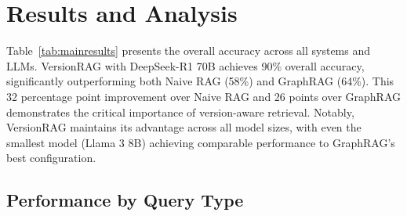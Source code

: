 \section{Results and Analysis}
\label{sec:results}



Table~\ref{tab:mainresults} presents the overall accuracy across all systems and LLMs. VersionRAG with DeepSeek-R1 70B achieves 90\% overall accuracy, significantly outperforming both Naive RAG (58\%) and GraphRAG (64\%). This 32 percentage point improvement over Naive RAG and 26 points over GraphRAG demonstrates the critical importance of version-aware retrieval. Notably, VersionRAG maintains its advantage across all model sizes, with even the smallest model (Llama 3 8B) achieving comparable performance to GraphRAG's best configuration.

\begin{table}[hb]
\centering
\small
\caption{Overall accuracy by query category. VersionRAG (our approach) consistently outperforms baselines across all configurations.}
\label{tab:mainresults}
\end{table}

\subsection{Performance by Query Type}

